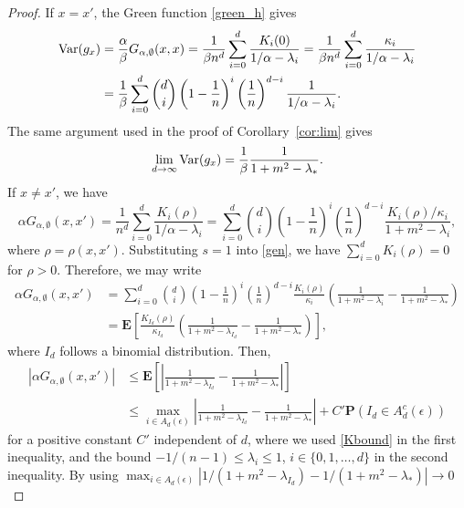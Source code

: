 \documentclass[a4paper,11pt]{article}
\theoremstyle{plain}
\theoremstyle{definition}
\begin{document}
\begin{proof}
  If $x=x'$, the Green function \eqref{green_h} gives
  \begin{align*}
    {\rm Var}(g_x)
    &=\frac{\alpha}{\beta}G_{\alpha,\emptyset}(x,x)
    =\frac{1}{\beta n^d}\sum_{i=0}^d\frac{K_i(0)}
    {1/\alpha-\lambda_i}
    =\frac{1}{\beta n^d}\sum_{i=0}^d\frac{\kappa_i}
    {1/\alpha-\lambda_i}\\
    &=\frac{1}{\beta}\sum_{i=0}^d
    {d \choose i}\left(1-\frac{1}{n}\right)^i
    \left(\frac{1}{n}\right)^{d-i}
    \frac{1}{1/\alpha-\lambda_i}.
  \end{align*}
  The same argument used in the proof of
  Corollary~\ref{cor:lim} gives
  \[
  \lim_{d\to\infty}{\rm Var}(g_x)
  =\frac{1}{\beta}\frac{1}{1+m^2-\lambda_*}.
  \]
  If $x\neq x'$, we have
  \begin{equation*}
    \alpha G_{\alpha,\emptyset}(x,x')=\frac{1}{n^d}
    \sum_{i=0}^d \frac{K_i(\rho)}{1/\alpha-\lambda_i}
    =\sum_{i=0}^d
    \binom{d}{i}\left(1-\frac{1}{n}\right)^i
    \left(\frac{1}{n}\right)^{d-i}
    \frac{K_i(\rho)/\kappa_i}{1+m^2-\lambda_i},
  \end{equation*}
  where $\rho=\rho(x,x')$.
  Substituting $s=1$ into \eqref{gen}, we have $\sum_{i=0}^d K_i(\rho)=0$
  for $\rho>0$. Therefore, we may write
  \begin{align*}
    \alpha G_{\alpha,\emptyset}(x,x')
    &=\sum_{i=0}^d
    \binom{d}{i}\left(1-\frac{1}{n}\right)^i
    \left(\frac{1}{n}\right)^{d-i}
    \frac{K_i(\rho)}{\kappa_i}
    \left(\frac{1}{1+m^2-\lambda_i}-\frac{1}{1+m^2-\lambda_*}\right)\\
    &=\mathbf{E}\left[
    \frac{K_{I_d}(\rho)}{\kappa_{I_d}}
    \left(\frac{1}{1+m^2-\lambda_{I_d}}-\frac{1}{1+m^2-\lambda_*}
    \right)\right],
  \end{align*}
  where $I_d$ follows a binomial distribution. Then,
  \begin{align*}
    |\alpha G_{\alpha,\emptyset}(x,x')|&\le
    \mathbf{E}\left[\left|
    \frac{1}{1+m^2-\lambda_{I_d}}-\frac{1}{1+m^2-\lambda_*}
    \right|\right]\\
    &\le
    \max_{i\in A_d(\epsilon)}
    \left|\frac{1}{1+m^2-\lambda_{I_d}}-\frac{1}{1+m^2-\lambda_*}\right|
    +C'\mathbf{P}(I_d\in A_d^c(\epsilon))
  \end{align*}
  for a positive constant $C'$ independent of $d$, where we used
  \eqref{Kbound} in the first inequality, and the bound
  $-1/(n-1)\le \lambda_i \le 1$, $i\in\{0,1,\ldots,d\}$ in
  the second inequality. By using
  $\max_{i\in A_d(\epsilon)}|1/(1+m^2-\lambda_{I_d})-1/(1+m^2-\lambda_*)|\to 0$

\end{proof}
\end{document}
